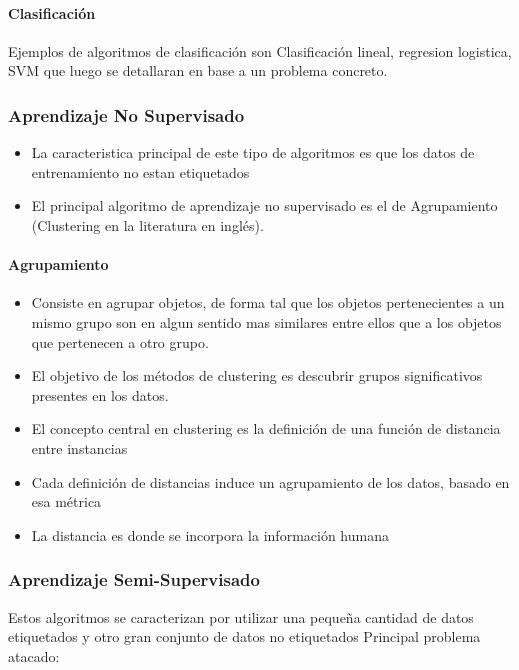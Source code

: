 \documentclass[a4paper,11pt,spanish]{book}
\begin{document}
	\paragraph {Clasificación}

	  Ejemplos de algoritmos de clasificación son Clasificación lineal, regresion logistica, SVM que luego se detallaran en base a un problema concreto.
    
      \subsubsection{Aprendizaje No Supervisado} 
	\begin{itemize}
	  \item La caracteristica principal de este tipo de algoritmos es que los datos de entrenamiento no estan etiquetados
	  \item El principal algoritmo de aprendizaje no supervisado es el de Agrupamiento (Clustering en la literatura en inglés).
	\end{itemize}
	\paragraph {Agrupamiento}
	  \begin{itemize}
	    \item Consiste en agrupar objetos, de forma tal que los objetos pertenecientes a un mismo grupo son en algun sentido mas similares entre ellos que a los objetos que pertenecen a otro grupo.
	    \item El objetivo de los métodos de clustering es descubrir grupos significativos presentes en los datos.
	    \item El concepto central en clustering es la definición de una función de distancia entre instancias
	    \item Cada definición de distancias induce un agrupamiento de los datos, basado en esa métrica
	    \item La distancia es donde se incorpora la información humana
	  \end{itemize}

      \subsubsection{Aprendizaje Semi-Supervisado}

	Estos algoritmos se caracterizan por utilizar una pequeña cantidad de datos etiquetados y otro gran conjunto de datos no etiquetados
	Principal problema atacado:
\end{document}
